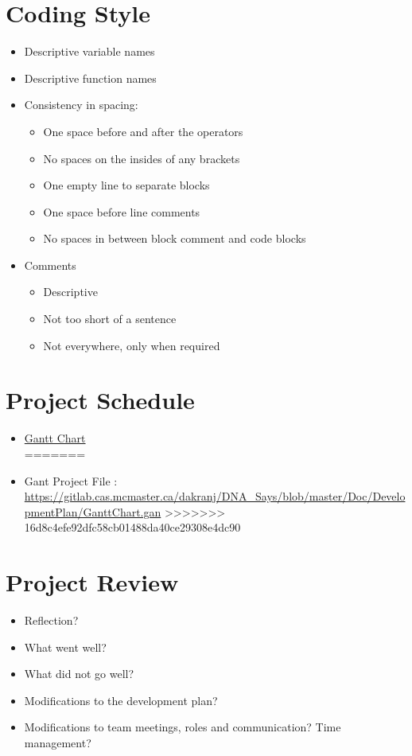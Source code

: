 \documentclass{article}
\begin{document}
\section{Coding Style}
\begin{itemize}
\item Descriptive variable names
\item Descriptive function names
\item Consistency in spacing:
\begin{itemize}
\item One space before and after the operators
\item No spaces on the insides of any brackets
\item One empty line to separate blocks
\item One space before line comments
\item No spaces in between block comment and code blocks
\end{itemize}
\item Comments
\begin{itemize}
\item Descriptive
\item Not too short of a sentence
\item Not everywhere, only when required
\end{itemize}
\end{itemize}
\section{Project Schedule}
\begin{itemize}
<<<<<<< HEAD
\item \href{run:GanttChart.gan} {Gantt Chart}\\
=======
\item Gant Project File :
\url{https://gitlab.cas.mcmaster.ca/dakranj/DNA_Says/blob/master/Doc/DevelopmentPlan/GanttChart.gan}
>>>>>>> 16d8c4efe92dfc58cb01488da40ce29308e4dc90
\end{itemize}
\section{Project Review}
\begin{itemize}
\item Reflection?
\item What went well?
\item  What did not go well?
\item Modifications to the development plan?
\item Modifications to team meetings, roles and communication? Time management?
\end{itemize}
\end{document}

